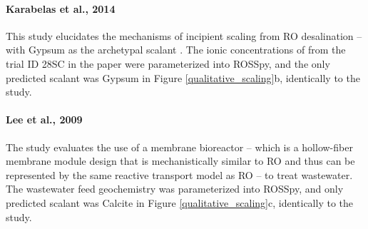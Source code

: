 \documentclass[journal=ACSES&TWater,manuscript=article]{achemso}
\begin{document}
\paragraph{Karabelas et al., 2014 \cite{Karabelas2014IncipientChannels}}
This study elucidates the mechanisms of incipient scaling from RO desalination -- with Gypsum as the archetypal scalant \cite{Lyster2009CoupledModule,Radu2014ASystems}. The ionic concentrations of from the trial ID 28SC in the paper were parameterized into ROSSpy, and the only predicted scalant was Gypsum in Figure \ref{qualitative_scaling}b, identically to the study.  

\paragraph{Lee et al., 2009 \cite{Lee2009MembraneWastewater}}
The study  evaluates the use of a membrane bioreactor -- which is a hollow-fiber membrane module design that is mechanistically similar to RO and thus can be represented by the same reactive transport model as RO -- to treat wastewater. The wastewater feed geochemistry was parameterized into ROSSpy, and only predicted scalant was Calcite in Figure \ref{qualitative_scaling}c, identically to the study.
\end{document}
